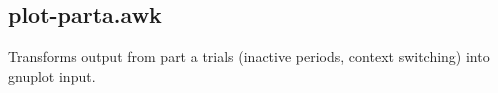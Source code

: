 \documentclass{article}
\begin{document}
\subsection{plot-parta.awk}
Transforms output from part a trials (inactive periods, context switching) into gnuplot input.


\end{document}
